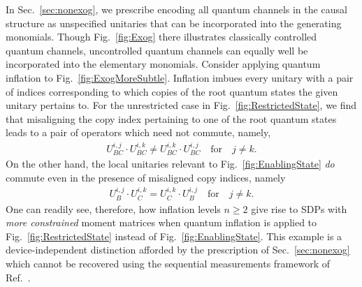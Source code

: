 \documentclass[superscriptaddress,aps,prx,nofootinbib,twocolumn,twoside,reprint,letterpaper,longbibliography]{revtex4-2}
\begin{document}
In Sec.~\ref{sec:nonexog}, we prescribe encoding all quantum channels in the causal structure as unspecified unitaries that can be incorporated into the generating monomials. Though Fig.~\ref{fig:Exog} there illustrates classically controlled quantum channels, uncontrolled quantum channels can equally well be incorporated into the elementary monomials.
Consider applying quantum inflation to Fig.~\ref{fig:ExogMoreSubtle}. Inflation imbues every unitary with a pair of indices corresponding to which copies of the root quantum states the given unitary pertains to. For the unrestricted case in Fig.~\ref{fig:RestrictedState}, we find that misaligning the copy index pertaining to one of the root quantum states leads to a pair of operators which need not commute, namely,
\begin{align}
  U^{i,j}_{BC} \!\!\cdot U^{i,k}_{BC} \neq U^{i,k}_{BC}\!\!\cdot U^{i,j}_{BC}\quad\text{for}\quad j\neq k .
\end{align}
On the other hand, the local unitaries relevant to Fig.~\ref{fig:EnablingState} \emph{do} commute even in the presence of misaligned copy indices, namely
\begin{align}
  U^{i,j}_{B} \!\!\cdot U^{i,k}_{C} = U^{i,k}_{C}\!\!\cdot U^{i,j}_{B}\quad\text{for}\quad j\neq k .
\end{align}
One can readily see, therefore, how inflation levels \mbox{$n\geq 2$} give rise to SDPs with \emph{more constrained} moment matrices when quantum inflation is applied to Fig.~\ref{fig:RestrictedState} instead of Fig.~\ref{fig:EnablingState}. This example is a device-independent distinction afforded by the prescription of Sec.~\ref{sec:nonexog} which cannot be recovered using the sequential measurements framework of Ref.~\cite{bowles2020bounding}.
\end{document}
